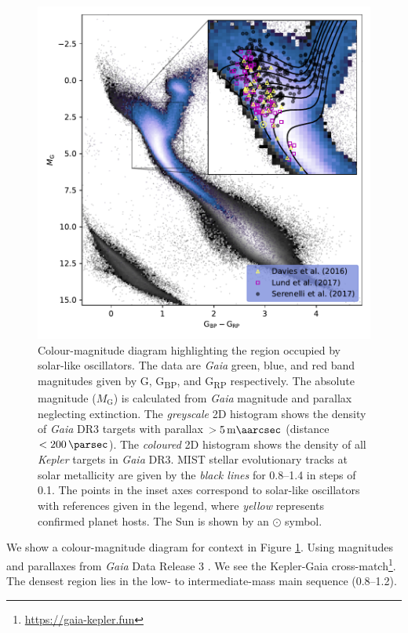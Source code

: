 \begin{figure}
    \centering
    \includegraphics{figures/hr-diagram.pdf}
    \caption[Colour-magnitude diagram highlighting the region occupied by dwarf and subgiant solar-like oscillators.]{Colour-magnitude diagram highlighting the region occupied by solar-like oscillators. The data are \emph{Gaia} green, blue, and red band magnitudes given by G, G\textsubscript{BP}, and G\textsubscript{RP} respectively. The absolute magnitude (\(M_\mathrm{G}\)) is calculated from \emph{Gaia} magnitude and parallax neglecting extinction. The \emph{greyscale} 2D histogram shows the density of \emph{Gaia} DR3 targets with parallax \(>\SI{5}{\milli\aarcsec}\) (distance \(<\SI{200}{\parsec}\)). The \emph{coloured} 2D histogram shows the density of all \emph{Kepler} targets in \emph{Gaia} DR3. MIST stellar evolutionary tracks at solar metallicity are given by the \emph{black lines} for \SIrange{0.8}{1.4}{\solarmass} in steps of \SI{0.1}{\solarmass}. The points in the inset axes correspond to solar-like oscillators with references given in the legend, where \emph{yellow} represents confirmed planet hosts. The Sun is shown by an \(\odot\) symbol.}
    \label{fig:hr-diagram}
\end{figure}

We show a colour-magnitude diagram for context in Figure \ref{fig:hr-diagram}. Using magnitudes and parallaxes from \emph{Gaia} Data Release 3 \citep[DR3;][]{GaiaCollaboration.Vallenari.ea2022}. We see the Kepler-Gaia cross-match\footnote{\url{https://gaia-kepler.fun}}. The densest region lies in the low- to intermediate-mass main sequence (\SIrange{0.8}{1.2}{\solarmass}).

